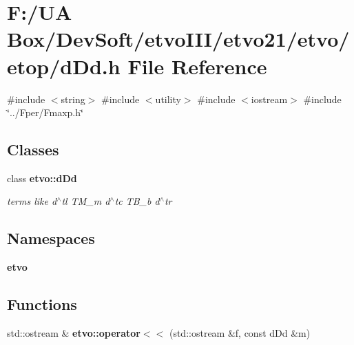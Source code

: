 \section{F\+:/\+UA Box/\+Dev\+Soft/etvo\+I\+I\+I/etvo21/etvo/etop/d\+Dd.h File Reference}
\label{d_dd_8h}
{\ttfamily \#include $<$string$>$}\newline
{\ttfamily \#include $<$utility$>$}\newline
{\ttfamily \#include $<$iostream$>$}\newline
{\ttfamily \#include \char`\"{}../\+Fper/\+Fmaxp.\+h\char`\"{}}\newline
\subsection*{Classes}
\begin{DoxyCompactItemize}
\item 
class \textbf{ etvo\+::d\+Dd}
\begin{DoxyCompactList}\small\item\em terms like d$^\wedge$tl T\+M\+\_\+m d$^\wedge$tc T\+B\+\_\+b d$^\wedge$tr \end{DoxyCompactList}\end{DoxyCompactItemize}
\subsection*{Namespaces}
\begin{DoxyCompactItemize}
\item 
 \textbf{ etvo}
\end{DoxyCompactItemize}
\subsection*{Functions}
\begin{DoxyCompactItemize}
\item 
std\+::ostream \& \textbf{ etvo\+::operator$<$$<$} (std\+::ostream \&f, const d\+Dd \&m)
\end{DoxyCompactItemize}
